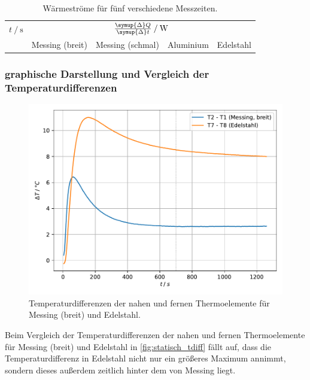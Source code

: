 \begin{table}[H]
     \centering
     \caption{Wärmeströme für fünf verschiedene Messzeiten.}
     \label{tab:waermestroeme}
     \begin{tabular}{r c c c c}
      \toprule
      $t \mathbin{/} \si{\second}$ &
      \multicolumn{4}{c}{$\frac{\symup{\Delta} Q}{\symup{\Delta} t} \mathbin{/} \si{\watt}$} \\
      \cmidrule(lr){2-5}
      &
      Messing (breit) &
      Messing (schmal) &
      Aluminium &
      Edelstahl \\
      \midrule
      
      \bottomrule
     \end{tabular}
\end{table}


\subsubsection{graphische Darstellung und Vergleich der Temperaturdifferenzen}

\begin{figure}[H]
  \centering
  \includegraphics{build/plot_statisch_tdiff.pdf}
  \caption{Temperaturdifferenzen der nahen und fernen Thermoelemente für Messing (breit) und Edelstahl.}
  \label{fig:statisch_tdiff}
\end{figure}

Beim Vergleich der Temperaturdifferenzen der nahen und fernen Thermoelemente für Messing (breit) und Edelstahl in  \autoref{fig:statisch_tdiff} fällt auf,
dass die Temperaturdifferenz in Edelstahl nicht nur ein größeres Maximum annimmt,
sondern dieses außerdem zeitlich hinter dem von Messing liegt.

